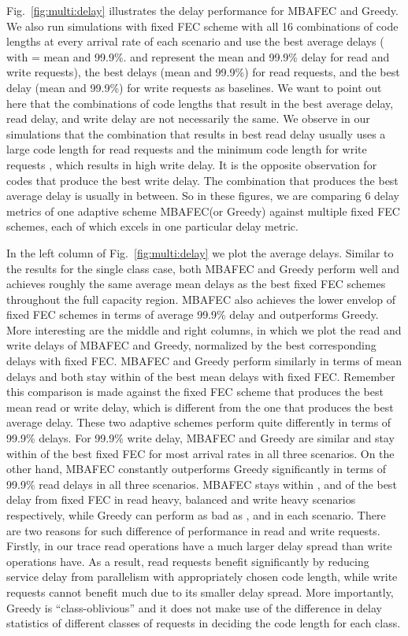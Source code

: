 \documentclass[journal]{IEEEtran}
\newcommand{\multiclass}{{MBAFEC}\xspace}
\begin{document}
Fig.~\ref{fig:multi:delay} illustrates the delay performance for \multiclass and Greedy. We also run simulations with fixed FEC scheme with all 16 combinations of code lengths at every arrival rate of each scenario and use the best average delays ( with  = mean  and 99.9\%.  and  represent the mean and 99.9\% delay for read and write requests), the best delays (mean and 99.9\%) for read requests, and the best delay (mean and 99.9\%) for write requests as baselines. We want to point out here that the combinations of code lengths that result in the best average delay, read delay, and write delay are not necessarily the same. We observe in our simulations that the combination that results in best read delay usually uses a large code length for read requests and the minimum code length for write requests , which results in high write delay. It is the opposite observation for codes that produce the best write delay. The combination that produces the best average delay is usually in between.
So in these figures, we are comparing 6 delay metrics of one adaptive scheme \multiclass (or Greedy) against multiple fixed FEC schemes, each of which excels in one particular delay metric.

In the left column of Fig.~\ref{fig:multi:delay} we plot the average delays. Similar to the results for the single class case, both \multiclass and Greedy perform well and achieves roughly the same average mean delays as the best fixed FEC schemes throughout the full capacity region. \multiclass also achieves the lower envelop of fixed FEC schemes in terms of  average 99.9\% delay and outperforms Greedy. More interesting are the middle and right columns, in which we plot the read and write delays of \multiclass and Greedy, normalized by the best corresponding delays with fixed FEC. \multiclass and Greedy perform similarly in terms of mean delays and both stay within  of the best mean delays with fixed FEC. Remember this comparison is made against the fixed FEC scheme that produces the best mean read or write delay, which is different from the one that produces the best average delay.
These two adaptive schemes perform quite differently in terms of 99.9\% delays. For 99.9\% write delay, \multiclass and Greedy are similar and stay within  of the best fixed FEC for most arrival rates in all three scenarios. On the other hand, \multiclass constantly outperforms Greedy significantly in terms of 99.9\% read delays in all three scenarios. \multiclass stays within ,  and  of the best delay from fixed FEC in read heavy,  balanced and write heavy scenarios respectively, while Greedy can perform as bad as ,  and  in each scenario.   
There are two reasons for such difference of performance in read and write requests. Firstly, in our trace read operations have a much larger delay spread than write operations have. As a result, read requests benefit significantly by reducing service delay from parallelism with appropriately chosen code length, while write requests cannot benefit much due to its smaller delay spread. More importantly, Greedy is ``class-oblivious'' and it does not make use of the difference in delay statistics of different classes of requests in deciding the code length for each class. 
\end{document}
